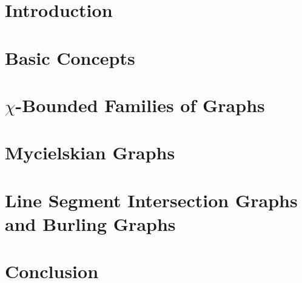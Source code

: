 \documentclass[12pt,a4paper]{scrartcl}
\theoremstyle{plain}
\theoremstyle{definition}
\numberwithin{equation}{section}
\theoremstyle{case}
\begin{document}
  \section{Introduction}\label{secIntro}
  
  \newpage
  
  \section{Basic Concepts}\label{secBC}
  
  \newpage 
  
  \section{$\chi$-Bounded Families of Graphs}\label{secCR}
  
  \newpage
  \section{Mycielskian Graphs}\label{secMy}
  
  \newpage
  
  \section{Line Segment Intersection Graphs and Burling Graphs}\label{secLS}
  
  \newpage
  
  \clearpage
  \pagestyle{plain}
  \mbox{}
  \clearpage
  \pagestyle{headings}
  
  \section{Conclusion}\label{secConc}
  
  \newpage


  \clearpage
  \pagestyle{plain}
  \mbox{}
  \clearpage
  \pagestyle{headings}
  
  \listoffigures
  \newpage
 
  \clearpage
  \pagestyle{plain}
  \mbox{}
  \clearpage
  \pagestyle{headings}
    
  
  
      

  \newpage
  
\end{document}
